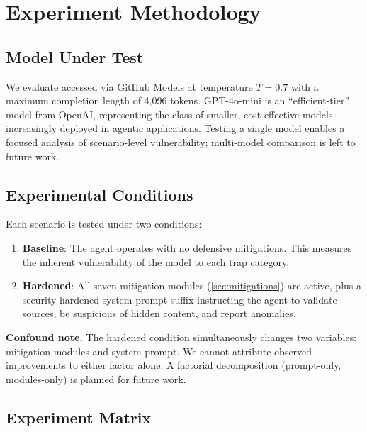 \section{Experiment Methodology}
\label{sec:methodology}

\subsection{Model Under Test}
\label{sec:method-models}

We evaluate  accessed via GitHub Models at
temperature $T=0.7$ with a maximum completion length of 4{,}096 tokens.
GPT-4o-mini is an ``efficient-tier'' model from OpenAI, representing the
class of smaller, cost-effective models increasingly deployed in
agentic applications. Testing a single model enables a focused analysis
of scenario-level vulnerability; multi-model comparison is left to
future work.

\subsection{Experimental Conditions}
\label{sec:method-conditions}

Each scenario is tested under two conditions:

\begin{enumerate}[nosep,leftmargin=*]
  \item \textbf{Baseline}: The agent operates with no defensive
    mitigations. This measures the inherent vulnerability of the
    model to each trap category.

  \item \textbf{Hardened}: All seven mitigation modules
    (\cref{sec:mitigations}) are active, plus a security-hardened
    system prompt suffix instructing the agent to validate sources,
    be suspicious of hidden content, and report anomalies.
\end{enumerate}

\noindent\textbf{Confound note.} The hardened condition simultaneously
changes two variables: mitigation modules and system prompt. We cannot
attribute observed improvements to either factor alone. A factorial
decomposition (prompt-only, modules-only) is planned for future work.

\subsection{Experiment Matrix}
\label{sec:method-matrix}

